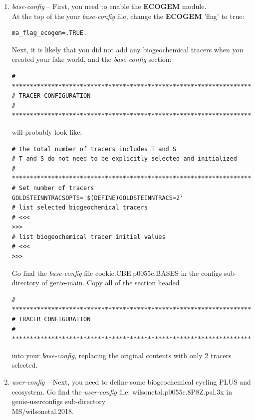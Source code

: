 \begin{enumerate}[noitemsep]

\vspace{1mm}
\item \textit{base-config} -- First, you need to enable the \textbf{ECOGEM} module.
\\At the top of the your \textit{base-config} file, change the \textbf{ECOGEM} 'flag' to true:
\vspace{-1mm}\begin{verbatim}
ma_flag_ecogem=.TRUE.
\end{verbatim}\vspace{-1mm}
Next, it is likely that you did not add any biogeochemical tracers when you created your fake world, and the \textit{base-config} section:
\footnotesize\begin{verbatim}
# *******************************************************************
# TRACER CONFIGURATION
# *******************************************************************
\end{verbatim}\normalsize
will probably look like:
\footnotesize\begin{verbatim}
# the total number of tracers includes T and S
# T and S do not need to be explicitly selected and initialized
# *******************************************************************
# Set number of tracers
GOLDSTEINNTRACSOPTS='$(DEFINE)GOLDSTEINNTRACS=2'
# list selected biogeochemical tracers
# <<<                                                             >>>
# list biogeochemical tracer initial values
# <<<                                                             >>>
\end{verbatim}\normalsize
Go find the \textit{base-config} file \textsf{\footnotesize cookie.CBE.p0055c.BASES} in the \textsf{\footnotesize configs} sub-directory of \textsf{\footnotesize genie-main}. Copy all of the section headed
\footnotesize\begin{verbatim}
# *******************************************************************
# TRACER CONFIGURATION
# *******************************************************************
\end{verbatim}\normalsize
into your \textit{base-config}, replacing the original contents with only 2 tracers selected.

\vspace{1mm}
\item \textit{user-config} -- Next, you need to define some biogeochemical cycling PLUS and ecosystem. Go find the \textit{user-config} file: \textsf{\footnotesize wilsonetal.p0055c.8P8Z.pal.3x} in \textsf{\footnotesize genie-userconfigs} sub-directory \\ \textsf{\footnotesize MS/wilsonetal.2018}.


\end{enumerate}
